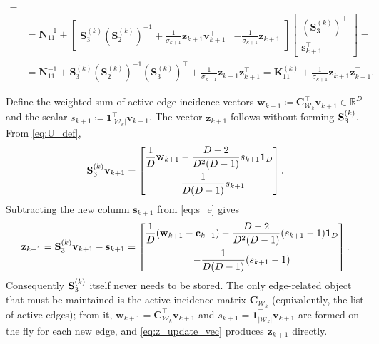 \documentclass[a4paper,12pt,openany]{book}
\newcommand{\C}{\mathbf{C}}
\newcommand{\K}{\mathbf{K}}
\newcommand{\N}{\mathbf{N}}
\let\oldS\S
\renewcommand{\S}{\ifmmode\mathbf{S}\else\oldS\fi}
\renewcommand{\c}{\mathbf{c}}
\newcommand{\s}{\mathbf{s}}
\renewcommand{\v}{\mathbf{v}}
\newcommand{\z}{\mathbf{z}}
\begin{document}
\begin{appendices}
\begin{align}
	=\nonumber\\
	&=\N_{11}^{-1}+\begin{bmatrix}
		\mathbf{S}_3^{(k)}(\mathbf{S}_2^{(k)})^{-1}+\frac{1}{\sigma_{k+1}}\z_{k+1}\v_{k+1}^\top &
		-\frac{1}{\sigma_{k+1}}\z_{k+1}
	\end{bmatrix}
	\begin{bmatrix} (\mathbf{S}_3^{(k)})^\top \\ \s_{k+1}^\top \end{bmatrix}= \nonumber \\
	&= \N_{11}^{-1}+\mathbf{S}_3^{(k)}(\mathbf{S}_2^{(k)})^{-1}(\mathbf{S}_3^{(k)})^\top+\frac{1}{\sigma_{k+1}}\z_{k+1}\z_{k+1}^\top=\K_{11}^{(k)}+\frac{1}{\sigma_{k+1}}\z_{k+1}\z_{k+1}^\top.
\end{align}

Define the weighted sum of active edge incidence vectors $\mathbf{w}_{k+1}\coloneqq\C_{\mathcal{W}_k}^\top\v_{k+1}\in\mathbb{R}^D$ and the scalar $s_{k+1}\coloneqq\mathbf{1}_{|\mathcal{W}_k|}^\top\v_{k+1}$. The vector $\z_{k+1}$ follows without forming $\S_3^{(k)}$. From \eqref{eq:U_def},
\begin{equation}
	\S_3^{(k)}\v_{k+1}
	=
	\begin{bmatrix}
		\displaystyle\frac{1}{D}\mathbf{w}_{k+1} - \frac{D-2}{D^2(D-1)}s_{k+1}\mathbf{1}_D\\[10pt]
		\displaystyle -\frac{1}{D(D-1)}s_{k+1}
	\end{bmatrix}.
\end{equation}
Subtracting the new column $\s_{k+1}$ from \eqref{eq:s_e} gives
\begin{equation}
	\label{eq:z_update_vec}
	\z_{k+1}
	=
	\S_3^{(k)}\v_{k+1}-\s_{k+1}
	=
	\begin{bmatrix}
		\displaystyle\frac{1}{D}(\mathbf{w}_{k+1}-\c_{k+1}) - \frac{D-2}{D^2(D-1)}(s_{k+1}-1)\mathbf{1}_D\\[10pt]
		\displaystyle -\frac{1}{D(D-1)}(s_{k+1}-1)
	\end{bmatrix}.
\end{equation}
Consequently $\S_3^{(k)}$ itself never needs to be stored. The only edge-related object that must be maintained is the active incidence matrix $\C_{\mathcal{W}_k}$ (equivalently, the list of active edges); from it, $\mathbf{w}_{k+1}=\C_{\mathcal{W}_k}^\top\v_{k+1}$ and $s_{k+1}=\mathbf{1}_{|\mathcal{W}_k|}^\top\v_{k+1}$ are formed on the fly for each new edge, and \eqref{eq:z_update_vec} produces $\z_{k+1}$ directly.



\end{appendices}
\end{document}
